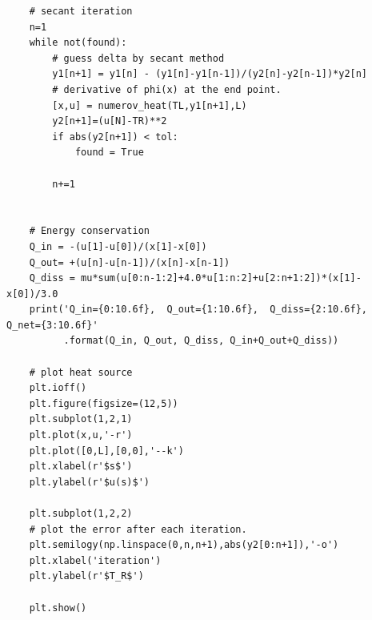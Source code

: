 \begin{verbatim}
    # secant iteration
    n=1
    while not(found):
        # guess delta by secant method
        y1[n+1] = y1[n] - (y1[n]-y1[n-1])/(y2[n]-y2[n-1])*y2[n]
        # derivative of phi(x) at the end point.
        [x,u] = numerov_heat(TL,y1[n+1],L)
        y2[n+1]=(u[N]-TR)**2
        if abs(y2[n+1]) < tol:
            found = True

        n+=1


    # Energy conservation
    Q_in = -(u[1]-u[0])/(x[1]-x[0])
    Q_out= +(u[n]-u[n-1])/(x[n]-x[n-1])
    Q_diss = mu*sum(u[0:n-1:2]+4.0*u[1:n:2]+u[2:n+1:2])*(x[1]-x[0])/3.0
    print('Q_in={0:10.6f},  Q_out={1:10.6f},  Q_diss={2:10.6f},  Q_net={3:10.6f}'
          .format(Q_in, Q_out, Q_diss, Q_in+Q_out+Q_diss))

    # plot heat source
    plt.ioff()
    plt.figure(figsize=(12,5))
    plt.subplot(1,2,1)
    plt.plot(x,u,'-r')
    plt.plot([0,L],[0,0],'--k')
    plt.xlabel(r'$s$')
    plt.ylabel(r'$u(s)$')

    plt.subplot(1,2,2)
    # plot the error after each iteration.
    plt.semilogy(np.linspace(0,n,n+1),abs(y2[0:n+1]),'-o')
    plt.xlabel('iteration')
    plt.ylabel(r'$T_R$')

    plt.show()
\end{verbatim}

\normalsize
{}

\newpage

